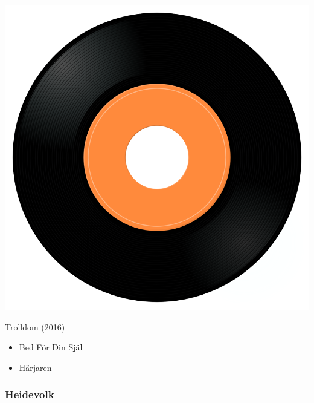 \begin{minipage}[t]{0.25\textwidth}
\captionsetup{type=figure}
\includegraphics[width=\textwidth]{Images/cover.png}
\caption*{Trolldom (2016)}
\end{minipage}
\begin{minipage}[t]{0.25\textwidth}\vspace{0pt}
\begin{itemize}[nosep,leftmargin=1em,labelwidth=*,align=left]
	\setlength{\itemsep}{0pt}
	\item Bed För Din Själ
	\item Härjaren
\end{itemize}
\end{minipage}

\subsubsection{Heidevolk}


